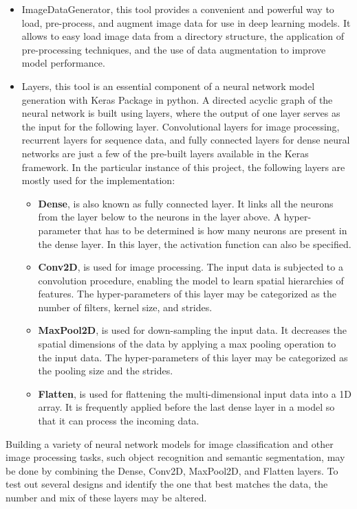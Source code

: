 \begin{itemize}
    \item ImageDataGenerator, this tool provides a convenient and powerful way to load, pre-process, and augment image data for use in deep learning models. It allows to easy load image data from a directory structure, the application of pre-processing techniques, and the use of data augmentation to improve model performance.
    \item Layers, this tool is an essential component of a neural network model generation with Keras Package in python. A directed acyclic graph of the neural network is built using layers, where the output of one layer serves as the input for the following layer. Convolutional layers for image processing, recurrent layers for sequence data, and fully connected layers for dense neural networks are just a few of the pre-built layers available in the Keras framework. In the particular instance of this project, the following layers are mostly used for the implementation: 
    
    \begin{itemize}
        \item \textbf{Dense}, is also known as fully connected layer.  It links all the neurons from the layer below to the neurons in the layer above. A hyper-parameter that has to be determined is how many neurons are present in the dense layer. In this layer, the activation function can also be specified.
        \item \textbf{Conv2D}, is used for image processing. The input data is subjected to a convolution procedure, enabling the model to learn spatial hierarchies of features. The hyper-parameters of this layer may be categorized as the number of filters, kernel size, and strides.
        \item \textbf{MaxPool2D}, is used for down-sampling the input data. It decreases the spatial dimensions of the data by applying a max pooling operation to the input data. The hyper-parameters of this layer may be categorized as the pooling size and the strides.
        \item  \textbf{Flatten},  is used for flattening the multi-dimensional input data into a 1D array. It is frequently applied before the last dense layer in a model so that it can process the incoming data.
    \end{itemize}
\end{itemize}

Building a variety of neural network models for image classification and other image processing tasks, such object recognition and semantic segmentation, may be done by combining the Dense, Conv2D, MaxPool2D, and Flatten layers. To test out several designs and identify the one that best matches the data, the number and mix of these layers may be altered.


